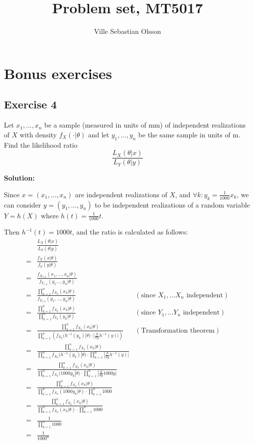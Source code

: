 \documentclass{article}
\title{Problem set, MT5017}
\author{Ville Sebastian Olsson}
\begin{document}
\maketitle
\tableofcontents

\section{Bonus exercises}
\subsection{Exercise 4}

Let \(x_1,\ldots,x_n\) be a sample (measured in units of mm) of independent
realizations of \(X\) with density \(f_X(\cdot |\theta)\) and let \(y_1, \ldots , y_n\) be the same sample in units of m. Find the likelihood ratio
\[\frac{L_X(\theta|x)}{L_Y(\theta|y)}\]

\textbf{Solution:}

Since \(x=(x_1,\ldots,x_n)\) are independent realizations of \(X\), and \(\forall k: y_k=\frac{1}{1000}x_k\), we can consider \(y=(y_1,\ldots, y_n)\) to be independent realizations of a random variable \(Y=h(X)\) where
\(h(t)=\frac{1}{1000}t\).

Then \(h^{-1}(t) = 1000t\), and the ratio is calculated as follows:
\begin{align*}
     & \frac{L_X(\theta|x)}{L_Y(\theta|y)} \\
    =& \frac{f_X(x|\theta)}{f_Y(y|\theta)} \\
    =& \frac{f_{X_{1:n}}(x_1,\ldots, x_n|\theta)}{f_{Y_{1:n}}(y_1\ldots, y_n|\theta)} \\
    =& \frac{\prod_{k=1}^n f_{X_k}(x_k|\theta)}{f_{Y_{1:n}}(y_1,\ldots,y_n|\theta)} & (\text{since }X_1,\ldots X_n\text{ independent}) \\
    =& \frac{\prod_{k=1}^n f_{X_k}(x_k|\theta)}{\prod_{k=1}^n f_{Y_k}(y_k|\theta)} & (\text{since }Y_1,\ldots Y_n\text{ independent}) \\
    =& \frac{\prod_{k=1}^n f_{X_k}(x_k|\theta)}{\prod_{k=1}^n \left( f_{X_k}(h^{-1}(y_k)|\theta) \cdot |\frac{d}{dy}h^{-1}(y)| \right)} & (\text{Transformation theorem}) \\
    =& \frac{\prod_{k=1}^n f_{X_k}(x_k|\theta)}{\prod_{k=1}^n f_{X_k}(h^{-1}(y_k)|\theta) \cdot \prod_{k=1}^n |\frac{d}{dy}h^{-1}(y)|} \\
    =& \frac{\prod_{k=1}^n f_{X_k}(x_k|\theta)}{\prod_{k=1}^n f_{X_k}(1000y_k|\theta) \cdot \prod_{k=1}^n |\frac{d}{dy}1000y|} \\
    =& \frac{\prod_{k=1}^n f_{X_k}(x_k|\theta)}{\prod_{k=1}^n f_{X_k}(1000y_k|\theta) \cdot \prod_{k=1}^n 1000} \\
    =& \frac{\prod_{k=1}^n f_{X_k}(x_k|\theta)}{\prod_{k=1}^n f_{X_k}(x_k|\theta) \cdot \prod_{k=1}^n 1000} \\
    =& \frac{1}{\prod_{k=1}^n 1000} \\
    =& \frac{1}{1000^n} \\
\end{align*}
\end{document}

